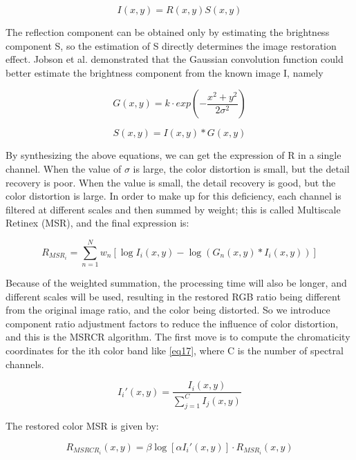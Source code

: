 \documentclass[conference]{IEEEtran}
\begin{document}
\begin{equation}
I(x,y) = R(x,y)S(x,y) \label{eq13}
\end{equation}

The reflection component can be obtained only by estimating the brightness component S, so the estimation of S directly determines the image restoration effect. Jobson et al.\cite{5} demonstrated that the Gaussian convolution function could better estimate the brightness component from the known image I, namely

\begin{equation}
G(x,y) = k \cdot exp(-\frac{x^2+y^2}{2\sigma^2}) \label{eq14}
\end{equation}

\begin{equation}
S(x,y) = I(x,y) * G(x,y) \label{eq15}
\end{equation}

By synthesizing the above equations, we can get the expression of R in a single channel. When the value of $\sigma$ is large, the color distortion is small, but the detail recovery is poor. When the value is small, the detail recovery is good, but the color distortion is large. In order to make up for this deficiency, each channel is filtered at different scales and then summed by weight; this is called Multiscale Retinex (MSR), and the final expression is:

\begin{equation}
R_{MSR_i} = \sum_{n=1}^N w_n [\log I_i(x,y) - \log (G_n(x,y)*I_i(x,y))]\label{eq16}
\end{equation}

Because of the weighted summation, the processing time will also be longer, and different scales will be used, resulting in the restored RGB ratio being different from the original image ratio, and the color being distorted. So we introduce component ratio adjustment factors to reduce the influence of color distortion, and this is the MSRCR algorithm. The first move is to compute the chromaticity coordinates for the ith color band like \eqref{eq17}, where C is the number of spectral channels.

\begin{equation}
I_i'(x,y) = \frac{I_i(x,y)}{\sum_{j=1}^C I_j(x,y)} \label{eq17}
\end{equation}

The restored color MSR is given by\cite{6}:

\begin{equation}
R_{MSRCR_i}(x,y) = \beta \log[\alpha I_i'(x,y)] \cdot R_{MSR_i}(x,y) \label{eq18}
\end{equation}
\end{document}
